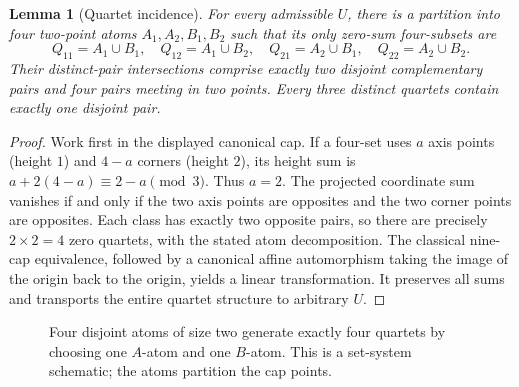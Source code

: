 \documentclass[12pt,a4paper]{article}
\newtheorem{lemma}[theorem]{Lemma}
\begin{document}
\begin{lemma}[Quartet incidence]\label{lem:quartets}
For every admissible $U$, there is a partition into four two-point atoms $A_1,A_2,B_1,B_2$ such that its \emph{only} zero-sum four-subsets are
\[
 Q_{11}=A_1\cup B_1,\quad Q_{12}=A_1\cup B_2,\quad Q_{21}=A_2\cup B_1,\quad Q_{22}=A_2\cup B_2.
\]
Their distinct-pair intersections comprise exactly two disjoint complementary pairs and four pairs meeting in two points. Every three distinct quartets contain exactly one disjoint pair.
\end{lemma}
\begin{proof}
Work first in the displayed canonical cap. If a four-set uses $a$ axis points (height $1$) and $4-a$ corners (height $2$), its height sum is $a+2(4-a)\equiv 2-a\pmod3$. Thus $a=2$. The projected coordinate sum vanishes if and only if the two axis points are opposites and the two corner points are opposites. Each class has exactly two opposite pairs, so there are precisely $2\times2=4$ zero quartets, with the stated atom decomposition. The classical nine-cap equivalence, followed by a canonical affine automorphism taking the image of the origin back to the origin, yields a linear transformation. It preserves all sums and transports the entire quartet structure to arbitrary $U$.
\end{proof}

\begin{figure}[htbp]\centering
{}
\caption{Four disjoint atoms of size two generate exactly four quartets by choosing one $A$-atom and one $B$-atom. This is a set-system schematic; the atoms partition the cap points.}\label{fig:atoms}
\end{figure}
\end{document}
